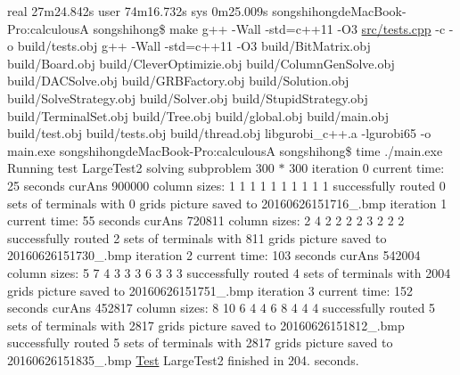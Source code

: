 real 27m24.\+842s user 74m16.\+732s sys 0m25.\+009s songshihongde\+Mac\+Book-\/\+Pro\+:calculousA songshihong\$ make g++ -\/\+Wall -\/std=c++11 -\/\+O3 \hyperlink{tests_8cpp}{src/tests.\+cpp} -\/c -\/o build/tests.\+obj g++ -\/\+Wall -\/std=c++11 -\/\+O3 build/\+Bit\+Matrix.\+obj build/\+Board.\+obj build/\+Clever\+Optimizie.\+obj build/\+Column\+Gen\+Solve.\+obj build/\+D\+A\+C\+Solve.\+obj build/\+G\+R\+B\+Factory.\+obj build/\+Solution.\+obj build/\+Solve\+Strategy.\+obj build/\+Solver.\+obj build/\+Stupid\+Strategy.\+obj build/\+Terminal\+Set.\+obj build/\+Tree.\+obj build/global.\+obj build/main.\+obj build/test.\+obj build/tests.\+obj build/thread.\+obj libgurobi\+\_\+c++.a -\/lgurobi65 -\/o main.\+exe songshihongde\+Mac\+Book-\/\+Pro\+:calculousA songshihong\$ time ./main.exe Running test Large\+Test2 solving subproblem 300 $\ast$ 300 iteration 0 current time\+: 25 seconds cur\+Ans 900000 column sizes\+: 1 1 1 1 1 1 1 1 1 1 successfully routed 0 sets of terminals with 0 grids picture saved to 20160626151716\+\_.\+bmp iteration 1 current time\+: 55 seconds cur\+Ans 720811 column sizes\+: 2 4 2 2 2 2 3 2 2 2 successfully routed 2 sets of terminals with 811 grids picture saved to 20160626151730\+\_.\+bmp iteration 2 current time\+: 103 seconds cur\+Ans 542004 column sizes\+: 5 7 4 3 3 3 6 3 3 3 successfully routed 4 sets of terminals with 2004 grids picture saved to 20160626151751\+\_.\+bmp iteration 3 current time\+: 152 seconds cur\+Ans 452817 column sizes\+: 8 10 6 4 4 6 8 4 4 4 successfully routed 5 sets of terminals with 2817 grids picture saved to 20160626151812\+\_.\+bmp successfully routed 5 sets of terminals with 2817 grids picture saved to 20160626151835\+\_.\+bmp \hyperlink{classTest}{Test} Large\+Test2 finished in 204. seconds.

